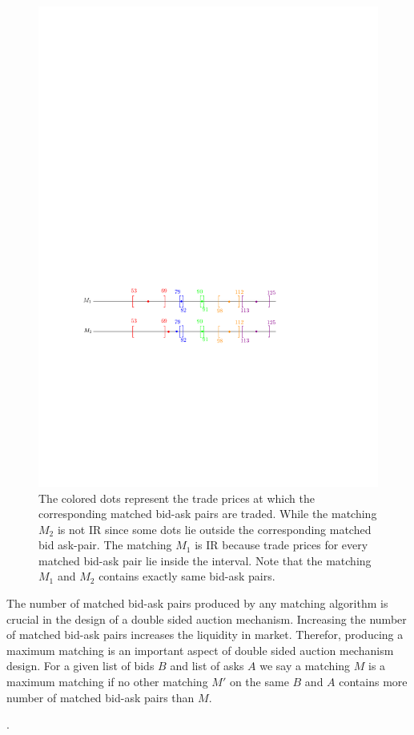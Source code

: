 \documentclass[a4paper,UKenglish,cleveref, autoref]{lipics-v2019}
\begin{document}
\begin{figure}[h!]
\centering
\includegraphics[width=.8\textwidth]{brack_IR.pdf}
\caption{ The colored dots represent the trade prices at which the corresponding matched bid-ask pairs are traded. While the matching $M_2$ is not IR since some dots lie outside the corresponding matched bid ask-pair. The matching $M_1$ is IR because trade prices for every matched bid-ask pair  lie inside the interval. Note that the matching $M_1$ and $M_2$ contains exactly same bid-ask pairs.}
\label{fig:IR}
\end{figure}

The number of matched bid-ask pairs produced by any matching algorithm is crucial in the design of a double sided auction mechanism. Increasing the number of matched bid-ask pairs increases the liquidity in market. Therefor, producing a maximum matching is an important aspect of double sided auction mechanism design. For a given list of bids $B$ and list of asks $A$ we say a matching $M$ is a maximum matching if no other matching $M'$ on the same $B$ and $A$ contains more number of matched bid-ask pairs than $M$. 

\begin{definition}
.
\end{definition}
\end{document}
